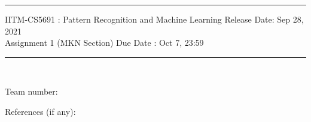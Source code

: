 \documentclass[solution,addpoints,12pt]{exam}
\begin{document}
\hrule
\vspace{3mm}
\noindent 
{\sf IITM-CS5691 : Pattern Recognition and Machine Learning  \hfill Release Date: Sep 28, 2021}
\\
\noindent 
{\sf Assignment 1 (MKN Section) \hfill Due Date : Oct 7, 23:59}
\vspace{3mm}
\hrule
\vspace{3mm}
\\%

\noindent
{{\sf Team number: }} %

\noindent
{{\sf References (if any): 
}} %
\end{document}
